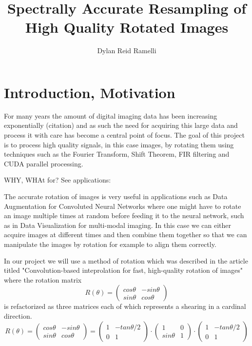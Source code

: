\documentclass[]{usiinfbachelorproject}
\title{Spectrally Accurate Resampling of High Quality Rotated Images}
\author{Dylan Reid Ramelli}
\begin{document}
	
	\maketitle	
	\section{Introduction, Motivation}\label{introduction}
	For many years the amount of digital imaging data has been increasing exponentially (citation) and as such the need for acquiring this large data and process it with care has become a central point of focus. The goal of this project is to process high quality signals, in this case images, by rotating them using techniques such as the Fourier Transform, Shift Theorem, FIR filtering and CUDA parallel processing.
		
		
	WHY, WHAt for? See applications:
	
	The accurate rotation of images is very useful in applications such as Data Augmentation for Convoluted Neural Networks where one might have to rotate an image multiple times at random before feeding it to the neural network, such as in Data Visualization for multi-modal imaging. In this case we can either acquire images at different times and then combine them together so that we can manipulate the images by rotation for example to align them correctly.
	
	In our project we will use a method of rotation which was described in the article titled "Convolution-based inteprolation for fast, high-quality rotation of images"\cite{main_article} where the rotation matrix
	\begin{equation*}
		R(\theta) = 
		\begin{pmatrix}
			cos\theta & -sin\theta\\
			sin\theta & cos\theta
		\end{pmatrix}
	\end{equation*} 
	is refactorized as three matrices each of which represents a shearing in a cardinal direction.
		\begin{equation*}
		R(\theta) = 
		\begin{pmatrix}
			cos\theta & -sin\theta\\
			sin\theta & cos\theta
		\end{pmatrix}
		=
		\begin{pmatrix}
			1 & -tan\theta/2\\
			0 & 1
		\end{pmatrix}
		\cdot
		\begin{pmatrix}
			1 & 0\\
			sin\theta & 1
		\end{pmatrix}
		\cdot
		\begin{pmatrix}
			1 & -tan\theta/2\\
			0 & 1
		\end{pmatrix}
	\end{equation*} 
	
\end{document}
